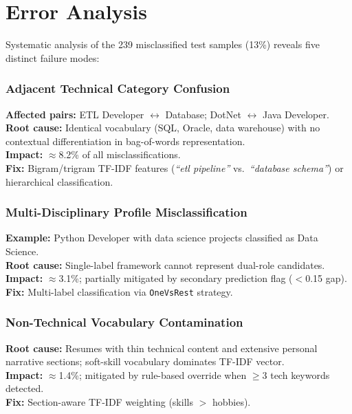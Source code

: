 \documentclass[10pt,twocolumn]{article}
\begin{document}
\section{Error Analysis}

Systematic analysis of the 239 misclassified test samples (13\%) reveals five distinct failure modes:

\subsubsection{Adjacent Technical Category Confusion}
\textbf{Affected pairs:} ETL Developer $\leftrightarrow$ Database; DotNet $\leftrightarrow$ Java Developer.\\
\textbf{Root cause:} Identical vocabulary (SQL, Oracle, data warehouse) with no contextual differentiation in bag-of-words representation.\\
\textbf{Impact:} $\approx$8.2\% of all misclassifications.\\
\textbf{Fix:} Bigram/trigram TF-IDF features (\textit{``etl pipeline''} vs.\ \textit{``database schema''}) or hierarchical classification.

\subsubsection{Multi-Disciplinary Profile Misclassification}
\textbf{Example:} Python Developer with data science projects classified as Data Science.\\
\textbf{Root cause:} Single-label framework cannot represent dual-role candidates.\\
\textbf{Impact:} $\approx$3.1\%; partially mitigated by secondary prediction flag ($<$0.15 gap).\\
\textbf{Fix:} Multi-label classification via \texttt{OneVsRest} strategy.

\subsubsection{Non-Technical Vocabulary Contamination}
\textbf{Root cause:} Resumes with thin technical content and extensive personal narrative sections; soft-skill vocabulary dominates TF-IDF vector.\\
\textbf{Impact:} $\approx$1.4\%; mitigated by rule-based override when $\geq$3 tech keywords detected.\\
\textbf{Fix:} Section-aware TF-IDF weighting (skills $>$ hobbies).
\end{document}
